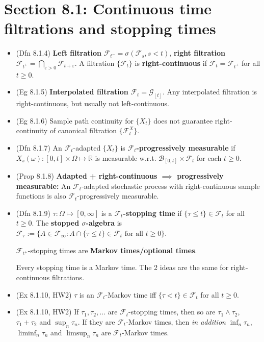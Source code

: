 \documentclass[twoside]{article}
\newcommand{\dis}{\displaystyle}
\def\lf{\left\lfloor}
\def\rf{\right\rfloor}
\newcommand\bbR{\mathbb{R}}
\newcommand\calB{\mathcal{B}}
\newcommand\calF{\mathcal{F}}
\newcommand\calG{\mathcal{G}}
\def\eps{\varepsilon}
\newcommand\om{\omega}
\newcommand\Om{\Omega}
\newcommand\sg{\sigma}
\begin{document}
\section*{Section 8.1: Continuous time filtrations and stopping times}
\begin{itemize}
\item (Dfn 8.1.4) \textbf{Left filtration} $\calF_{t^-} = \sg(\calF_s, s < t)$, \textbf{right filtration} $\calF_{t^+} = \dis\bigcap_{\eps > 0} \calF_{t + \eps}$. A filtration $\{ \calF_t\}$ is \textbf{right-continuous} if $\calF_t = \calF_{t^+}$ for all $t \geq 0$.

\item (Eg 8.1.5) \textbf{Interpolated filtration} $\calF_t = \calG_{\lf t \rf}$. Any interpolated filtration is right-continuous, but usually not left-continuous.

\item (Eg 8.1.6) Sample path continuity for $\{ X_t\}$ does not guarantee right-continuity of canonical filtration $\{ \calF_t^X\}$.

\item (Dfn 8.1.7) An $\calF_t$-adapted $\{ X_t \}$ is \textbf{$\calF_t$-progressively measurable} if $X_s(\om): [0,t] \times \Om \mapsto \bbR$ is measurable w.r.t. $\calB_{[0,t]} \times \calF_t$ for each $t \geq 0$.

\item (Prop 8.1.8) \textbf{Adapted + right-continuous  $\implies$ progressively measurable:} An $\calF_t$-adapted stochastic process with right-continuous sample functions is also $\calF_t$-progressively measurable.

\item (Dfn 8.1.9) $\tau: \Om \mapsto [0, \infty]$ is a \textbf{$\calF_t$-stopping time} if $\{\tau \leq t\} \in \calF_t$ for all $t \geq 0$. The \textbf{stopped $\sg$-algebra} is $\calF_{\tau} := \{ A \in \calF_\infty: A \cap \{ \tau \leq t\} \in \calF_t \text{ for all } t \geq 0 \}$.

$\calF_{t^+}$-stopping times are \textbf{Markov times/optional times}.

Every stopping time is a Markov time. The 2 ideas are the same for right-continuous filtrations.

\item (Ex 8.1.10, HW2) $\tau$ is an $\calF_t$-Markov time iff $\{\tau < t\} \in \calF_t$ for all $t \geq 0$.

\item (Ex 8.1.10, HW2) If $\tau_1, \tau_2, \dots$ are $\calF_t$-stopping times, then so are $\tau_1 \wedge \tau_2$, $\tau_1 + \tau_2$ and $\sup_n \tau_n$. If they are $\calF_t$-Markov times, then \emph{in addition} $\inf_n \tau_n$, $\liminf_n \tau_n$ and $\limsup_n \tau_n$ are $\calF_t$-Markov times.


\end{itemize}
\end{document}
